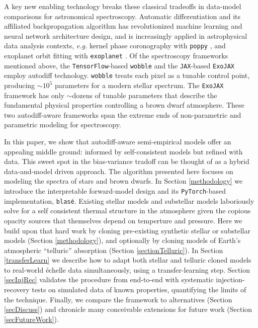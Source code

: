\documentclass[twocolumn]{aastex631}
\begin{document}
A key new enabling technology breaks these classical tradeoffs in data-model comparisons for astronomical spectroscopy.  Automatic differentiation \citep[``autodiff'' or ``autograd'',][]{2015arXiv150205767G, 2016PhDT.......317M} and its affiliated backpropagation algorithm \citep{kelley1960,Linnainmaa1976TaylorEO, 1986Natur.323..533R, 1990JGCD...13..926D} has revolutionized machine learning and neural network architecture design, and is increasingly applied in astrophysical data analysis contexts, \emph{e.g.} kernel phase coronography with \texttt{poppy} \citep{2021ApJ...907...40P}, and exoplanet orbit fitting with \texttt{exoplanet} \citep{2021JOSS....6.3285F}.  Of the spectroscopy frameworks mentioned above, the \texttt{TensorFlow}-based \citep{tensorflow2015-whitepaper} \texttt{wobble} and the \texttt{JAX}-based \citep{jax2018github} \texttt{ExoJAX} employ autodiff technology.  \texttt{wobble} treats each pixel as a tunable control point, producing $\sim10^5$ parameters for a modern stellar spectrum.  The \texttt{ExoJAX} framework has only $\sim$dozens of tunable parameters that describe the fundamental physical properties controlling a brown dwarf atmosphere.  These two autodiff-aware frameworks span the extreme ends of non-parametric and parametric modeling for spectroscopy.

In this paper, we show that autodiff-aware semi-empirical models offer an appealing middle ground: informed by self-consistent models but refined with data.  This sweet spot in the bias-variance tradoff can be thought of as a hybrid data-and-model driven approach.  The algorithm presented here focuses on modeling the spectra of stars and brown dwarfs.  In Section \ref{methodology} we introduce the interpretable forward-model design and its \texttt{PyTorch}-based \citep{2019arXiv191201703P} implementation, \texttt{blas\'e}.  Existing stellar models \citep[\emph{e.g.}][]{husser13} and substellar models \citep[\emph{e.g.}][]{2021ApJ...920...85M} laboriously solve for a self consistent thermal structure in the atmosphere given the copious opacity sources that themselves depend on temperture and pressure.  Here we build upon that hard work by cloning pre-existing synthetic stellar or substellar models (Section \ref{methodology}), and optionally by cloning models of Earth's atmospheric ``telluric'' absorption (Section \ref{sectionTelluric}). In Section \ref{transferLearn} we describe how to adapt both stellar and telluric cloned models to real-world \'echelle data simultaneously, using a transfer-learning step.  Section \ref{secInjRec} validates the procedure from end-to-end with systematic injection-recovery tests on simulated data of known properties, quantifying the limits of the technique.  Finally, we compare the framework to alternatives (Section \ref{secDiscuss}) and chronicle many conceivable extensions for future work (Section \ref{secFutureWork}).
\end{document}
